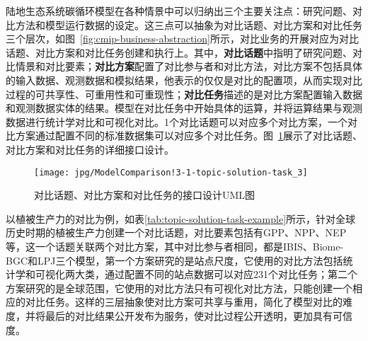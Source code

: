陆地生态系统碳循环模型在各种情景中可以归纳出三个主要关注点：研究问题、对比方法和模型运行数据的设定。这三点可以抽象为对比话题、对比方案和对比任务三个层次，如图~\ref{fig:cmip-business-abstraction}所示，对比业务的开展对应为对比话题、对比方案和对比任务创建和执行上。其中，\textbf{对比话题}中指明了研究问题、对比情景和对比要素；\textbf{对比方案}配置了对比参与者和对比方法，对比方案不包括具体的输入数据、观测数据和模拟结果，他表示的仅仅是对比的配置项，从而实现对比过程的可共享性、可重用性和可重现性；\textbf{对比任务}描述的是对比方案配置输入数据和观测数据实体的结果。模型在对比任务中开始具体的运算，并将运算结果与观测数据进行统计学对比和可视化对比。1个对比话题可以对应多个对比方案，一个对比方案通过配置不同的标准数据集可以对应多个对比任务。图~\ref{fig:ModelComparison!3-1-topic-solution-task_3}展示了对比话题、对比方案和对比任务的详细接口设计。

\begin{figure}[!htbp]
    \centering
    \texttt{[image: jpg/ModelComparison!3-1-topic-solution-task\_3]}
    \caption{对比话题、对比方案和对比任务的接口设计UML图}
    \label{fig:ModelComparison!3-1-topic-solution-task_3}
\end{figure}

以植被生产力的对比为例，如表\ref{tab:topic-solution-task-example}所示，针对全球历史时期的植被生产力创建一个对比话题，对比要素包括有GPP、NPP、NEP等，这一个话题关联两个对比方案，其中对比参与者相同，都是IBIS、Biome-BGC和LPJ三个模型，第一个方案研究的是站点尺度，它使用的对比方法包括统计学和可视化两大类，通过配置不同的站点数据可以对应231个对比任务；第二个方案研究的是全球范围，它使用的对比方法只有可视化对比方法，只能创建一个相应的对比任务。这样的三层抽象使对比方案可共享与重用，简化了模型对比的难度，并将最后的对比结果公开发布为服务，使对比过程公开透明，更加具有可信度。

